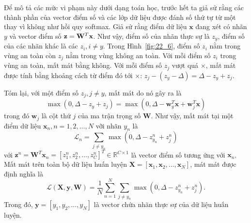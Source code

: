 Để mô tả các mức vi phạm này dưới dạng toán học, trước hết ta giả sử rằng các
thành phần của vector điểm số và các lớp dữ liệu được đánh số thứ tự từ một thay
vì không như hồi quy softmax. Giả sử rằng điểm dữ liệu $\mathbf{x}$ đang xét có
nhãn $y$ và vector điểm số $\mathbf{z} = \mathbf{W}^T\mathbf{x}$. Như vậy, điểm số của nhãn
thực sự là $z_y$, điểm số của các nhãn khác là các $z_i, i \neq y$. Trong
Hình~\ref{fig:22_6}, điểm số $z_i$ nằm trong vùng an toàn còn $z_j$ nằm trong
vùng không an toàn. Với mỗi điểm số $z_i$ trong vùng an toàn, mất mát bằng
không. Với mỗi điểm số $z_j$ vượt quá $\times$, mất mát được tính bằng khoảng
cách từ điểm đó tới $\times$: $z_j - (z_y - \Delta) =
\Delta - z_y + z_j$.



Tóm lại, với một điểm số $z_j, j \neq y$, mất mát do nó gây ra là
\begin{equation}
\label{eqn:22_1}
\max(0, \Delta - z_y + z_j) = \max(0, \Delta - \mathbf{w}_y^T\mathbf{x} + \mathbf{w}_j^T\mathbf{x})
\end{equation}
trong đó $\mathbf{w}_j$ là {cột} thứ $j$ của ma trận trọng số $\mathbf{W}$.
Như vậy, mất mát tại một điểm dữ liệu $\mathbf{x}_n, n = 1, 2, \dots, N$ vỡi nhãn $y_n$ là
\begin{equation*}
\mathcal{L}_n = \sum_{j \neq y_n} \max(0, \Delta  - z_{y_n}^n + z_j^n)
\end{equation*}
với $\mathbf{z}^n = \mathbf{W}^T\mathbf{x}_n = [z^n_1, z^n_2, \dots,
z^n_C]^T \in \mathbb{R}^{C \times 1}$ là vector điểm số tương ứng với $\mathbf{x}_n$.
Mất mát trên toàn bộ dữ liệu huấn luyện $\mathbf{X} = [\mathbf{x}_1, \mathbf{x}_2, \dots,
\mathbf{x}_N ]$, mát mát được định nghĩa là
\begin{equation}
\label{eqn:22_2}
\mathcal{L}(\mathbf{X}, \mathbf{y}, \mathbf{W}) = \frac{1}{N}\sum_{n=1}^N \sum_{j \neq y_n} \max(0, \Delta - z_{y_n}^n + z_j^n).
\end{equation}
Trong đó, $\mathbf{y} = [y_1, y_2, \dots, y_N]$ là vector chứa nhãn thực sự
của dữ liệu huấn luyện.

